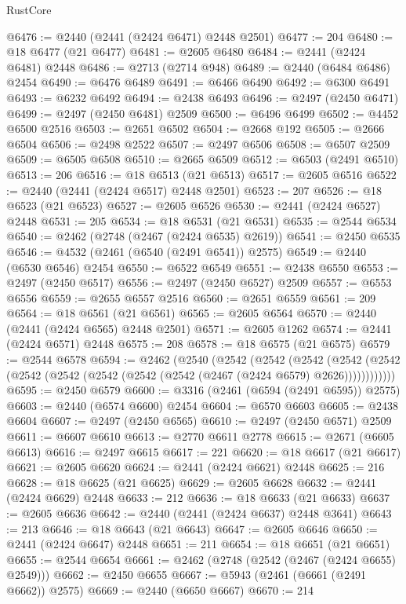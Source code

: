\begin{lexlean}{RustCore}
\begin{coremodule}
@6476 := @2440 (@2441 (@2424 @6471) @2448 @2501)
@6477 := 204
@6480 := @18 @6477 (@21 @6477)
@6481 := @2605 @6480
@6484 := @2441 (@2424 @6481) @2448
@6486 := @2713 (@2714 @948)
@6489 := @2440 (@6484 @6486) @2454
@6490 := @6476 @6489
@6491 := @6466 @6490
@6492 := @6300 @6491
@6493 := @6232 @6492
@6494 := @2438 @6493
@6496 := @2497 (@2450 @6471)
@6499 := @2497 (@2450 @6481) @2509
@6500 := @6496 @6499
@6502 := @4452 @6500 @2516
@6503 := @2651 @6502
@6504 := @2668 @192
@6505 := @2666 @6504
@6506 := @2498 @2522
@6507 := @2497 @6506
@6508 := @6507 @2509
@6509 := @6505 @6508
@6510 := @2665 @6509
@6512 := @6503 (@2491 @6510)
@6513 := 206
@6516 := @18 @6513 (@21 @6513)
@6517 := @2605 @6516
@6522 := @2440 (@2441 (@2424 @6517) @2448 @2501)
@6523 := 207
@6526 := @18 @6523 (@21 @6523)
@6527 := @2605 @6526
@6530 := @2441 (@2424 @6527) @2448
@6531 := 205
@6534 := @18 @6531 (@21 @6531)
@6535 := @2544 @6534
@6540 := @2462 (@2748 (@2467 (@2424 @6535) @2619))
@6541 := @2450 @6535
@6546 := @4532 (@2461 (@6540 (@2491 @6541)) @2575)
@6549 := @2440 (@6530 @6546) @2454
@6550 := @6522 @6549
@6551 := @2438 @6550
@6553 := @2497 (@2450 @6517)
@6556 := @2497 (@2450 @6527) @2509
@6557 := @6553 @6556
@6559 := @2655 @6557 @2516
@6560 := @2651 @6559
@6561 := 209
@6564 := @18 @6561 (@21 @6561)
@6565 := @2605 @6564
@6570 := @2440 (@2441 (@2424 @6565) @2448 @2501)
@6571 := @2605 @1262
@6574 := @2441 (@2424 @6571) @2448
@6575 := 208
@6578 := @18 @6575 (@21 @6575)
@6579 := @2544 @6578
@6594 := @2462
    (@2540
      (@2542
        (@2542
          (@2542
            (@2542 (@2542 (@2542 (@2542 (@2542 (@2542 (@2542 (@2467 (@2424 @6579) @2626))))))))))))
@6595 := @2450 @6579
@6600 := @3316 (@2461 (@6594 (@2491 @6595)) @2575)
@6603 := @2440 (@6574 @6600) @2454
@6604 := @6570 @6603
@6605 := @2438 @6604
@6607 := @2497 (@2450 @6565)
@6610 := @2497 (@2450 @6571) @2509
@6611 := @6607 @6610
@6613 := @2770 @6611 @2778
@6615 := @2671 (@6605 @6613)
@6616 := @2497 @6615
@6617 := 221
@6620 := @18 @6617 (@21 @6617)
@6621 := @2605 @6620
@6624 := @2441 (@2424 @6621) @2448
@6625 := 216
@6628 := @18 @6625 (@21 @6625)
@6629 := @2605 @6628
@6632 := @2441 (@2424 @6629) @2448
@6633 := 212
@6636 := @18 @6633 (@21 @6633)
@6637 := @2605 @6636
@6642 := @2440 (@2441 (@2424 @6637) @2448 @3641)
@6643 := 213
@6646 := @18 @6643 (@21 @6643)
@6647 := @2605 @6646
@6650 := @2441 (@2424 @6647) @2448
@6651 := 211
@6654 := @18 @6651 (@21 @6651)
@6655 := @2544 @6654
@6661 := @2462 (@2748 (@2542 (@2467 (@2424 @6655) @2549)))
@6662 := @2450 @6655
@6667 := @5943 (@2461 (@6661 (@2491 @6662)) @2575)
@6669 := @2440 (@6650 @6667)
@6670 := 214

\end{coremodule}
\end{lexlean}
